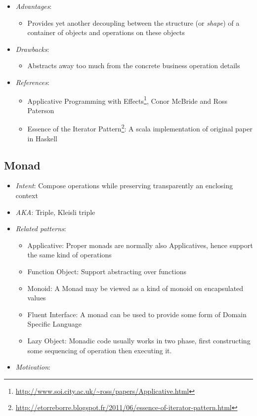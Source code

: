 \documentclass[11pt,]{article}
\renewcommand{\href}[2]{#2\footnote{\url{#1}}}
\begin{document}
\begin{itemize}
\item
  \emph{Advantages}:

  \begin{itemize}
  \item
    Provides yet another decoupling between the structure (or
    \emph{shape}) of a container of objects and operations on these
    objects
  \end{itemize}
\item
  \emph{Drawbacks}:

  \begin{itemize}
  \item
    Abstracts away too much from the concrete business operation details
  \end{itemize}
\item
  \emph{References}:

  \begin{itemize}
  \item
    \href{http://www.soi.city.ac.uk/~ross/papers/Applicative.html}{Applicative
    Programming with Effects}, Conor McBride and Ross Paterson
  \item
    \href{http://etorreborre.blogspot.fr/2011/06/essence-of-iterator-pattern.html}{Essence
    of the Iterator Pattern}: A scala implementation of original paper
    in Haskell
  \end{itemize}
\end{itemize}

\subsection{Monad}

\begin{itemize}
\item
  \emph{Intent}: Compose operations while preserving transparently an
  enclosing context
\item
  \emph{AKA}: Triple, Kleisli triple
\item
  \emph{Related patterns}:

  \begin{itemize}
  \item
    Applicative: Proper monads are normally also Applicatives, hence
    support the same kind of operations
  \item
    Function Object: Support abstracting over functions
  \item
    Monoid: A Monad may be viewed as a kind of monoid on encapsulated
    values
  \item
    Fluent Interface: A monad can be used to provide some form of Domain
    Specific Language
  \item
    Lazy Object: Monadic code usually works in two phase, first
    constructing some sequencing of operation then executing it.
  \end{itemize}
\item
  \emph{Motivation}:
\end{itemize}
\end{document}
